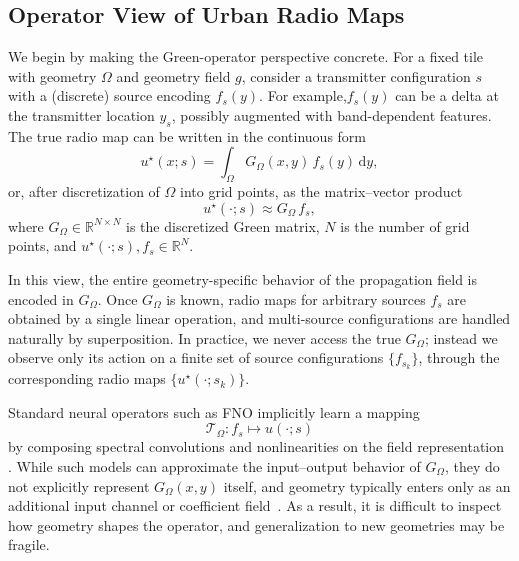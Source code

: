\documentclass{article}
\begin{document}
\subsection{Operator View of Urban Radio Maps}
\label{sec:operator_view}


We begin by making the Green-operator perspective concrete.
For a fixed tile with geometry $\Omega$ and geometry field $g$,
consider a transmitter configuration $s$ with a (discrete) source encoding $f_s(y)$.
For example,$f_s(y)$ can be a delta at the transmitter location $y_s$,
possibly augmented with band-dependent features.
The true radio map can be written in the continuous form
\begin{equation}
u^\star(x; s)
= \int_\Omega G_\Omega(x, y)\, f_s(y)\,\mathrm{d}y,
\label{eq:green_true}
\end{equation}
or, after discretization of $\Omega$ into grid points,
as the matrix–vector product
\begin{equation}
u^\star(\cdot; s)
\approx G_\Omega\, f_s,
\end{equation}
where $G_\Omega \in \mathbb{R}^{N \times N}$ is the discretized Green matrix,
$N$ is the number of grid points, and $u^\star(\cdot; s), f_s \in \mathbb{R}^N$.

In this view, the entire geometry-specific behavior of the propagation field
is encoded in $G_\Omega$.
Once $G_\Omega$ is known, radio maps for arbitrary sources $f_s$ are obtained by
a single linear operation, and multi-source configurations are handled naturally
by superposition.
In practice, we never access the true $G_\Omega$; instead we observe only
its action on a finite set of source configurations $\{f_{s_k}\}$,
through the corresponding radio maps $\{u^\star(\cdot; s_k)\}$.

Standard neural operators such as FNO implicitly learn a mapping
\begin{equation}
\mathcal{T}_\Omega : f_s \mapsto u(\cdot; s)
\end{equation}
by composing spectral convolutions and nonlinearities on the field representation
\cite{li2020fourier,li2021physics,lu2021deeponet}.
While such models can approximate the input–output behavior of $G_\Omega$,
they do not explicitly represent $G_\Omega(x, y)$ itself,
and geometry typically enters only as an additional input channel
or coefficient field~\cite{gao2021geofno,li2025fnoMIMO}.
As a result, it is difficult to inspect how geometry shapes the operator,
and generalization to new geometries may be fragile.
\end{document}
